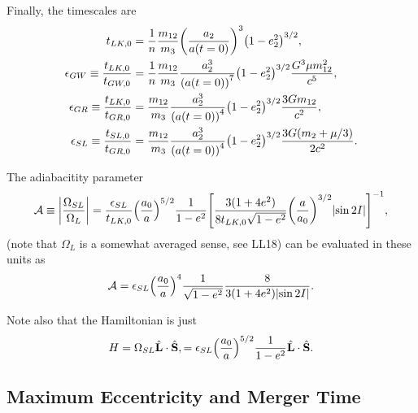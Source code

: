 \documentclass[11pt,
        usenames, %
        dvipsnames %
    ]{article}
\newcommand*{\bm}[1]{\boldsymbol{\mathbf{#1}}}
\DeclarePairedDelimiter\abs{\lvert}{\rvert}
\DeclarePairedDelimiter\p{\lparen}{\rparen}
\DeclarePairedDelimiter\s{\lbrack}{\rbrack}
\begin{document}
Finally, the timescales are
\begin{align}
    t_{LK, 0} &= \frac{1}{n}
        \frac{m_{12}}{m_3}\p*{\frac{a_2}{a(t = 0)}}^3 \p*{1 - e_2^2}^{3/2},\\
    \epsilon_{GW} \equiv \frac{t_{LK, 0}}{t_{GW, 0}}
        &= \frac{1}{n}
            \frac{m_{12}}{m_3}\frac{a_2^3}{\p*{a(t = 0)}^7} \p*{1 - e_2^2}^{3/2}
            \frac{G^3 \mu m_{12}^2}{c^5},\\
    \epsilon_{GR} \equiv \frac{t_{LK, 0}}{t_{GR, 0}}
        &= \frac{m_{12}}{m_3}\frac{a_2^3}{\p*{a(t = 0)}^4} \p*{1 - e_2^2}^{3/2}
            \frac{3Gm_{12}}{c^2},\\
    \epsilon_{SL} \equiv \frac{t_{SL, 0}}{t_{GR, 0}}
        &= \frac{m_{12}}{m_3}\frac{a_2^3}{\p*{a(t = 0)}^4} \p*{1 - e_2^2}^{3/2}
            \frac{3G\p*{m_2 + \mu/3}}{2c^2}.
\end{align}

The adiabacitity parameter
\begin{equation}
    \mathcal{A} \equiv \abs*{\frac{\Omega_{SL}}{\Omega_L}}
        = \frac{\epsilon_{SL}}{t_{LK, 0}}
            \p*{\frac{a_0}{a}}^{5/2}\frac{1}{1 - e^2}
            \s*{\frac{3(1 + 4e^2)}{8t_{LK, 0}\sqrt{1 - e^2}}
                \p*{\frac{a}{a_0}}^{3/2}\abs*{\sin 2I}}^{-1},
\end{equation}
(note that $\Omega_L$ is a somewhat averaged sense, see LL18) can be evaluated
in these units as
\begin{equation}
    \mathcal{A} = \epsilon_{SL}\p*{\frac{a_0}{a}}^4\frac{1}{\sqrt{1 - e^2}}
        \frac{8}{3\p*{1 + 4e^2}\abs*{\sin 2I}}.
\end{equation}

Note also that the Hamiltonian is just
\begin{equation}
    H = \Omega_{SL} \hat{\bm{L}} \cdot \hat{\bm{S}},
        = \epsilon_{SL}\p*{\frac{a_0}{a}}^{5/2} \frac{1}{1 - e^2}
            \hat{\bm{L}} \cdot \hat{\bm{S}}.
\end{equation}

\subsection{Maximum Eccentricity and Merger Time}
\end{document}

